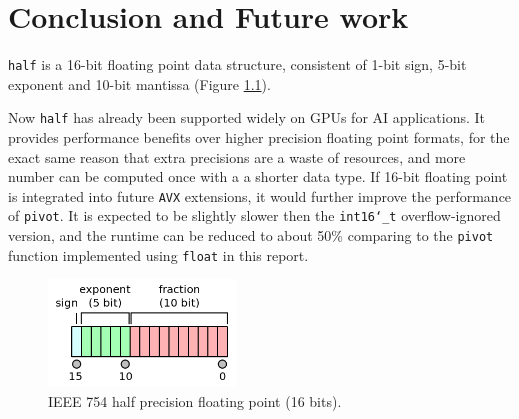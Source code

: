 \documentclass[logo,bsc,singlespacing,parskip]{infthesis}
\newcommand{\dtshort}{\texttt{int16\char`_t}}
\newcommand{\dthalf}{\texttt{half}}
\newcommand{\dtfloat}{\texttt{float}}
\newcommand{\pivot}{\texttt{pivot}}
\begin{document}
\chapter{Conclusion and Future work}

\dthalf{} is a 16-bit floating point data structure, consistent of 1-bit sign,
5-bit exponent and 10-bit mantissa (Figure \ref{fig:ieee-f16}). 

Now \dthalf{} has already been supported widely on GPUs for AI applications. It
provides performance benefits over higher precision floating point formats, for
the exact same reason that extra precisions are a waste of resources, and more
number can be computed once with a a shorter data type. If 16-bit floating point
is integrated into future \texttt{AVX} extensions, it would further improve the
performance of \pivot{}. It is expected to be slightly slower then the \dtshort{}
overflow-ignored version, and the runtime can be reduced to about 50\% comparing
to the \pivot{} function implemented using \dtfloat{} in this report.

\begin{figure}
    \begin{center}
    \includegraphics[width=50mm,scale=0.1]{image/ieee-f16.png}
    \end{center}
    \caption{IEEE 754 half precision floating point (16 bits).~\cite{ieee754-diagram}}
    \label{fig:ieee-f16}
\end{figure}




\end{document}
